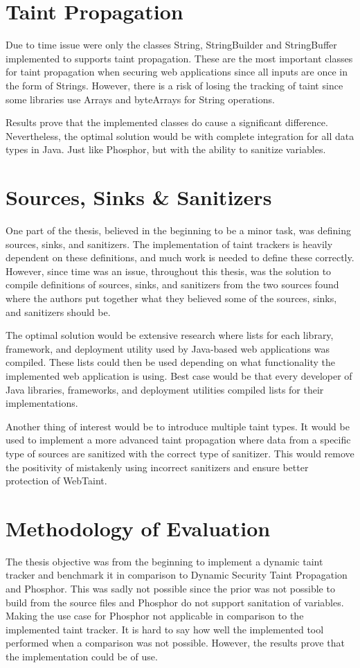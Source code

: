 \section{Taint Propagation}
\label{propagation}
Due to time issue were only the classes String, StringBuilder and StringBuffer implemented to supports taint propagation. These are the most important classes for taint propagation when securing web applications since all inputs are once in the form of Strings. However, there is a risk of losing the tracking of taint since some libraries use Arrays and byteArrays for String operations.

Results prove that the implemented classes do cause a significant difference. Nevertheless, the optimal solution would be with complete integration for all data types in Java. Just like Phosphor, but with the ability to sanitize variables.



\section{Sources, Sinks \& Sanitizers}
\label{sss}
One part of the thesis, believed in the beginning to be a minor task, was defining sources, sinks, and sanitizers. The implementation of taint trackers is heavily dependent on these definitions, and much work is needed to define these correctly. However, since time was an issue, throughout this thesis, was the solution to compile definitions of sources, sinks, and sanitizers from the two sources found where the authors put together what they believed some of the sources, sinks, and sanitizers should be.

The optimal solution would be extensive research where lists for each library, framework, and deployment utility used by Java-based web applications was compiled. These lists could then be used depending on what functionality the implemented web application is using. Best case would be that every developer of Java libraries, frameworks, and deployment utilities compiled lists for their implementations.

Another thing of interest would be to introduce multiple taint types. It would be used to implement a more advanced taint propagation where data from a specific type of sources are sanitized with the correct type of sanitizer. This would remove the positivity of mistakenly using incorrect sanitizers and ensure better protection of WebTaint.



\section{Methodology of Evaluation}
\label{methev}
The thesis objective was from the beginning to implement a dynamic taint tracker and benchmark it in comparison to Dynamic Security Taint Propagation and Phosphor. This was sadly not possible since the prior was not possible to build from the source files and Phosphor do not support sanitation of variables. Making the use case for Phosphor not applicable in comparison to the implemented taint tracker. It is hard to say how well the implemented tool performed when a comparison was not possible. However, the results prove that the implementation could be of use.